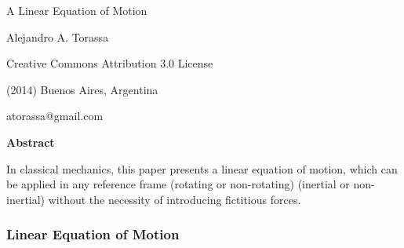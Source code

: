 \documentclass[10pt]{article}
\begin{document}
\begin{center}

{\Large A Linear Equation of Motion}

\bigskip \medskip

Alejandro A. Torassa

\bigskip \medskip

\footnotesize

Creative Commons Attribution 3.0 License

(2014) Buenos Aires, Argentina

atorassa@gmail.com

\bigskip \smallskip

\small

{\bf Abstract}

\bigskip

\parbox{74mm}{In classical mechanics, this paper presents a linear equation of motion, which can be applied in any reference frame (rotating or non-rotating) (inertial or non-inertial) without the necessity of introducing fictitious forces.}

\end{center}

\normalsize

\vspace{-0.60em}

{\centering\subsubsection*{Linear Equation of Motion}}

\vspace{+1.20em}
\end{document}
